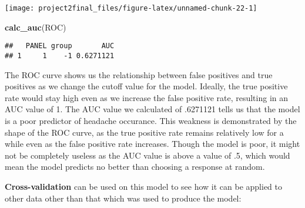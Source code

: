 \documentclass[]{article}
\newenvironment{Shaded}{\begin{snugshade}}{\end{snugshade}}
\newcommand{\KeywordTok}[1]{\textcolor[rgb]{0.13,0.29,0.53}{\textbf{#1}}}
\newcommand{\NormalTok}[1]{#1}
\begin{document}
\begin{center}\texttt{[image: project2final\_files/figure-latex/unnamed-chunk-22-1]} \end{center}

\begin{Shaded}
\begin{Highlighting}[]
\KeywordTok{calc_auc}\NormalTok{(ROC)}
\end{Highlighting}
\end{Shaded}

\begin{verbatim}
##   PANEL group       AUC
## 1     1    -1 0.6271121
\end{verbatim}

The ROC curve shows us the relationship between false positives and true
positives as we change the cutoff value for the model. Ideally, the true
positive rate would stay high even as we increase the false positive
rate, resulting in an AUC value of 1. The AUC value we calculated of
.6271121 tells us that the model is a poor predictor of headache
occurance. This weakness is demonstrated by the shape of the ROC curve,
as the true positive rate remains relatively low for a while even as the
false positive rate increases. Though the model is poor, it might not be
completely useless as the AUC value is above a value of .5, which would
mean the model predicts no better than choosing a response at random.

\textbf{Cross-validation} can be used on this model to see how it can be
applied to other data other than that which was used to produce the
model:
\end{document}
